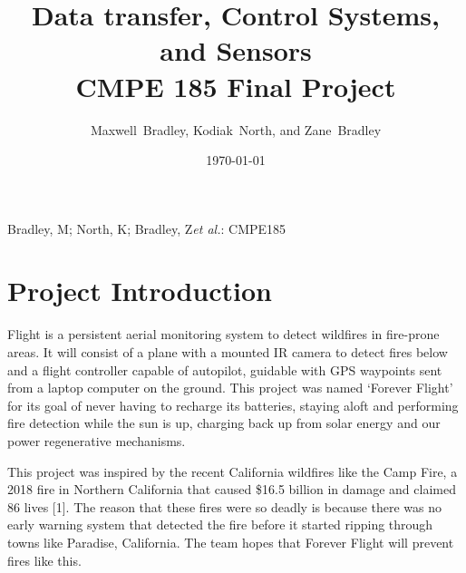 \documentclass[12pt,journal,compsoc]{IEEEtran}
\begin{document}
\title{Data transfer, Control Systems, and Sensors\\
	CMPE 185 Final Project}
\author{Maxwell~Bradley, Kodiak~North, and Zane~Bradley}

\date{\today} %

%
{Bradley, M; North, K; Bradley, Z\MakeLowercase{\textit{et al.}}: CMPE185}


\maketitle

\tableofcontents 

\section{Project Introduction}

 Flight is a persistent aerial monitoring system to detect wildfires in fire-prone areas. It will consist of a plane with a mounted IR camera to detect fires below and a flight controller capable of autopilot, guidable with GPS waypoints sent from a laptop computer on the ground. This project was named `Forever Flight' for its goal of never having to recharge its batteries, staying aloft and performing fire detection while the sun is up, charging back up from solar energy and our power regenerative mechanisms. 

This project was inspired by the recent California wildfires like the Camp Fire, a 2018 fire in Northern California that caused \$16.5 billion in damage and claimed 86 lives [1]. The reason that these fires were so deadly is because there was no early warning system that detected the fire before it started ripping through towns like Paradise, California. The team hopes that Forever Flight will prevent fires like this.
\end{document}
